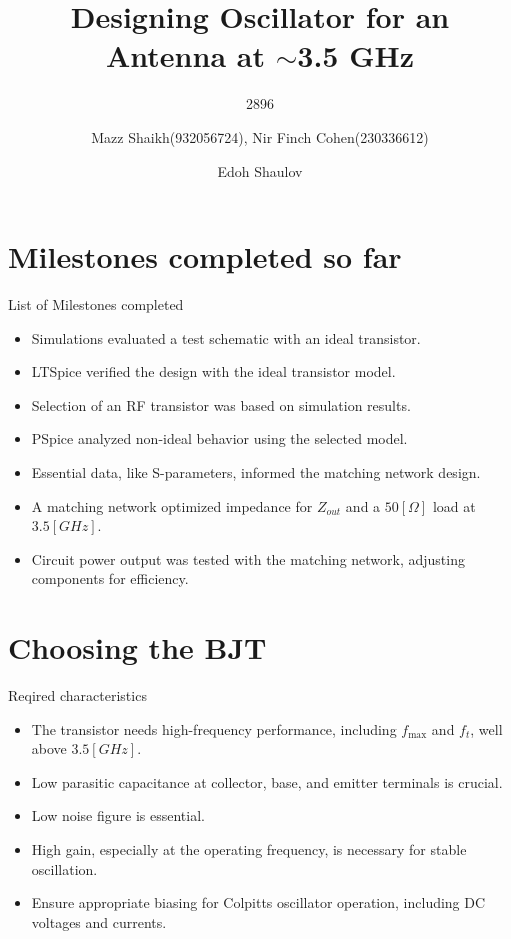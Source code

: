 \documentclass{beamer}
\title{Designing Oscillator for an Antenna at \(\sim\)3.5 GHz}
\date{}
\subtitle{2896}
\author{Mazz Shaikh(932056724), Nir Finch Cohen(230336612)}
\date{Edoh Shaulov}
\institute{Tel Aviv University}
\begin{document}
\maketitle


\section{Milestones completed so far}

\begin{frame}{List of Milestones completed}

  \begin{itemize}
    \item<1-> Simulations evaluated a test schematic with an ideal transistor.
    \item<2-> LTSpice verified the design with the ideal transistor model.
    \item<3-> Selection of an RF transistor was based on simulation results.
    \item<4-> PSpice analyzed non-ideal behavior using the selected model.
    \item<5-> Essential data, like S-parameters, informed the matching network design.
    \item<6-> A matching network optimized impedance for \(Z_{out}\) and a \(50[\Omega]\) load at \(3.5[GHz]\).
    \item<7-> Circuit power output was tested with the matching network, adjusting components for efficiency.
  \end{itemize}
  
  

\end{frame}





\section{Choosing the BJT}
\begin{frame}{Reqired characteristics}
  \begin{itemize}
    \item <1-> The transistor needs high-frequency performance, including \(f_{\text{max}}\) and \(f_t\), well above \(3.5[GHz]\).
    \item <2-> Low parasitic capacitance at collector, base, and emitter terminals is crucial.
    \item <3-> Low noise figure is essential.
    \item <4-> High gain, especially at the operating frequency, is necessary for stable oscillation.
    \item <5-> Ensure appropriate biasing for Colpitts oscillator operation, including DC voltages and currents.
  \end{itemize}
\end{frame}
\end{document}
